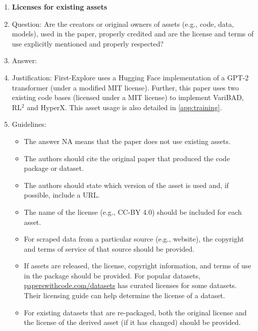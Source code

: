 \documentclass{article}
\begin{document}
\begin{enumerate}
\begin{itemize}
        \item Datasets that have been scraped from the Internet could pose safety risks. The authors should describe how they avoided releasing unsafe images.
        \item We recognize that providing effective safeguards is challenging, and many papers do not require this, but we encourage authors to take this into account and make a best faith effort.
    \end{itemize}
\item {\bf Licenses for existing assets}
    \item[] Question: Are the creators or original owners of assets (e.g., code, data, models), used in the paper, properly credited and are the license and terms of use explicitly mentioned and properly respected?
    \item[] Answer: \answerYes{}
    \item[] Justification: First-Explore uses a \cite{wolf2020huggingfaces} Hugging Face implementation of a \cite{radford2019language} GPT-2 transformer (under a modified MIT license). Further, this paper uses two existing code bases (licensed under a MIT license) to implement VariBAD, RL\(^2\) and HyperX. This asset usage is also detailed in \cref{app:training}.
    \item[] Guidelines:
    \begin{itemize}
        \item The answer NA means that the paper does not use existing assets.
        \item The authors should cite the original paper that produced the code package or dataset.
        \item The authors should state which version of the asset is used and, if possible, include a URL.
        \item The name of the license (e.g., CC-BY 4.0) should be included for each asset.
        \item For scraped data from a particular source (e.g., website), the copyright and terms of service of that source should be provided.
        \item If assets are released, the license, copyright information, and terms of use in the package should be provided. For popular datasets, \url{paperswithcode.com/datasets} has curated licenses for some datasets. Their licensing guide can help determine the license of a dataset.
        \item For existing datasets that are re-packaged, both the original license and the license of the derived asset (if it has changed) should be provided.

\end{itemize}
\end{enumerate}
\end{document}
